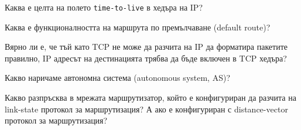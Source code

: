 \begin{questions}
  \question Каква е целта на полето \texttt{time-to-live} в хедъра на IP?

  \question Каква е функционалността на маршрута по премълчаване
  (\foreignlanguage{english}{default route})?

  \question Вярно ли е, че тъй като TCP не може да разчита на IP да форматира
  пакетите правилно, IP адресът на дестинацията трябва да бъде включен в TCP
  хедъра?

  \question Какво наричаме автономна система
  (\foreignlanguage{english}{autonomous system, AS})?

  \question Какво разпръсква в мрежата маршрутизатор, който е конфигуриран да
  разчита на \foreignlanguage{english}{link-state} протокол за маршрутизация? А
  ако е конфигуриран с \foreignlanguage{english}{distance-vector} протокол за
  маршрутизация?
\end{questions}

